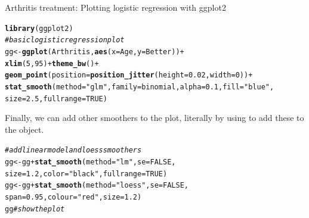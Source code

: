 \documentclass[11pt]{book}\usepackage[]{graphicx}\usepackage[]{color}
\makeatletter
\newcommand{\hlnum}[1]{\textcolor[rgb]{0.686,0.059,0.569}{#1}}%
\newcommand{\hlstr}[1]{\textcolor[rgb]{0.192,0.494,0.8}{#1}}%
\newcommand{\hlcom}[1]{\textcolor[rgb]{0.678,0.584,0.686}{\textit{#1}}}%
\newcommand{\hlopt}[1]{\textcolor[rgb]{0,0,0}{#1}}%
\newcommand{\hlstd}[1]{\textcolor[rgb]{0.345,0.345,0.345}{#1}}%
\newcommand{\hlkwb}[1]{\textcolor[rgb]{0.69,0.353,0.396}{#1}}%
\newcommand{\hlkwc}[1]{\textcolor[rgb]{0.333,0.667,0.333}{#1}}%
\newcommand{\hlkwd}[1]{\textcolor[rgb]{0.737,0.353,0.396}{\textbf{#1}}}%
\newenvironment{kframe}{%
 \def\at@end@of@kframe{}%
 \ifinner\ifhmode%
  \def\at@end@of@kframe{\end{minipage}}%
  \begin{minipage}{\columnwidth}%
 \fi\fi%
 \def\FrameCommand##1{\hskip\@totalleftmargin \hskip-\fboxsep
 \colorbox{shadecolor}{##1}\hskip-\fboxsep
     \hskip-\linewidth \hskip-\@totalleftmargin \hskip\columnwidth}%
 \MakeFramed {\advance\hsize-\width
   \@totalleftmargin\z@ \linewidth\hsize
   \@setminipage}}%
 {\par\unskip\endMakeFramed%
 \at@end@of@kframe}
\newenvironment{knitrout}{}{} %
\renewenvironment{knitrout}{\small\renewcommand{\baselinestretch}{.85}}{} %
\makeatother
\begin{document}
\begin{Example}[arthrit8]{Arthritis treatment: Plotting logistic regression with ggplot2}
\begin{knitrout}
\color{fgcolor}\begin{kframe}
\begin{alltt}
\hlkwd{library}\hlstd{(ggplot2)}
\hlcom{# basic logistic regression plot}
\hlstd{gg} \hlkwb{<-} \hlkwd{ggplot}\hlstd{(Arthritis,} \hlkwd{aes}\hlstd{(}\hlkwc{x}\hlstd{=Age,} \hlkwc{y}\hlstd{=Better))} \hlopt{+}
  \hlkwd{xlim}\hlstd{(}\hlnum{5}\hlstd{,} \hlnum{95}\hlstd{)} \hlopt{+} \hlkwd{theme_bw}\hlstd{()} \hlopt{+}
  \hlkwd{geom_point}\hlstd{(}\hlkwc{position} \hlstd{=} \hlkwd{position_jitter}\hlstd{(}\hlkwc{height} \hlstd{=} \hlnum{0.02}\hlstd{,} \hlkwc{width} \hlstd{=} \hlnum{0}\hlstd{))} \hlopt{+}
  \hlkwd{stat_smooth}\hlstd{(}\hlkwc{method} \hlstd{=} \hlstr{"glm"}\hlstd{,} \hlkwc{family} \hlstd{= binomial,} \hlkwc{alpha} \hlstd{=} \hlnum{0.1}\hlstd{,} \hlkwc{fill}\hlstd{=}\hlstr{"blue"}\hlstd{,}
              \hlkwc{size}\hlstd{=}\hlnum{2.5}\hlstd{,} \hlkwc{fullrange}\hlstd{=}\hlnum{TRUE}\hlstd{)}
\end{alltt}
\end{kframe}
\end{knitrout}
Finally, we can add other smoothers to the plot, literally by using \code{+} 
to add these to the  object.
\begin{knitrout}
\color{fgcolor}\begin{kframe}
\begin{alltt}
\hlcom{# add linear model and loess smoothers}
\hlstd{gg} \hlkwb{<-} \hlstd{gg} \hlopt{+} \hlkwd{stat_smooth}\hlstd{(}\hlkwc{method} \hlstd{=} \hlstr{"lm"}\hlstd{,} \hlkwc{se}\hlstd{=}\hlnum{FALSE}\hlstd{,}
                       \hlkwc{size}\hlstd{=}\hlnum{1.2}\hlstd{,} \hlkwc{color}\hlstd{=}\hlstr{"black"}\hlstd{,} \hlkwc{fullrange}\hlstd{=}\hlnum{TRUE}\hlstd{)}
\hlstd{gg} \hlkwb{<-} \hlstd{gg} \hlopt{+} \hlkwd{stat_smooth}\hlstd{(}\hlkwc{method} \hlstd{=} \hlstr{"loess"}\hlstd{,} \hlkwc{se}\hlstd{=}\hlnum{FALSE}\hlstd{,}
                       \hlkwc{span}\hlstd{=}\hlnum{0.95}\hlstd{,} \hlkwc{colour}\hlstd{=}\hlstr{"red"}\hlstd{,} \hlkwc{size}\hlstd{=}\hlnum{1.2}\hlstd{)}
\hlstd{gg}  \hlcom{# show the plot}
\end{alltt}
\end{kframe}
\end{knitrout}

\end{Example}
\end{document}
